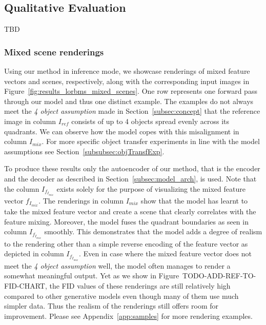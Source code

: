 \documentclass[12pt,a4paper]{article}
\begin{document}

\subsection{Qualitative Evaluation}
TBD

\subsubsection{Mixed scene renderings}
Using our method in inference mode, we showcase renderings of mixed feature vectors and scenes, respectively, along with the corresponding input images in Figure~\ref{fig:results_lorbms_mixed_scenes}. One row represents one forward pass through our model and thus one distinct example. The examples do not always meet the \textit{4 object assumption} made in Section~\ref{subsec:concept} that the reference image in column $I_{ref}$ consists of up to 4 objects spread evenly across its quadrants. We can observe how the model copes with this misalignment in column $I_{mix}$. For more specific object transfer experiments in line with the model assumptions see Section~\ref{subsubsec:objTransfExp}. 

To produce these results only the autoencoder of our method, that is the encoder and the decoder as described in Section~\ref{subsec:model_arch}, is used. Note that the column $I_{f_{I_{mix}}}$ exists solely for the purpose of visualizing the mixed feature vector $f_{I_{mix}}$. The renderings in column $I_{mix}$ show that the model has learnt to take the mixed feature vector and create a scene that clearly correlates with the feature mixing. Moreover, the model fuses the quadrant boundaries as seen in column $I_{f_{I_{mix}}}$ smoothly. This demonstrates that the model adds a degree of realism to the rendering other than a simple reverse encoding of the feature vector as depicted in column $I_{f_{I_{mix}}}$. Even in case where the mixed feature vector does not meet the \textit{4 object assumption} well, the model often manages to render a somewhat meaningful output. Yet as we show in Figure~TODO-ADD-REF-TO-FID-CHART, the FID values of these renderings are still relatively high compared to other generative models even though many of them use much simpler data. Thus the realism of the renderings still offers room for improvement.
Please see Appendix~\ref{app:samples} for more rendering examples.
\end{document}
